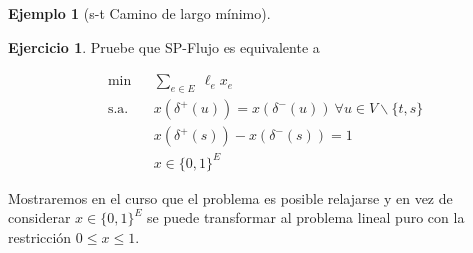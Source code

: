 \documentclass[10pt]{article}
\theoremstyle{plain}
\theoremstyle{definition}
\newtheorem{eje}{Ejemplo}
\newtheorem{ejer}{Ejercicio}
\begin{document}
\begin{eje}[s-t Camino de largo mínimo]
\begin{enumerate}[\bf I.-]
\begin{ejer}Pruebe que SP-Flujo es equivalente a

\begin{equation*}
\begin{aligned}
& \min
& & \displaystyle{\sum_{e \in E}}~\ell_{e}x_{e}\\
& \text{s.a.}
& & x(\delta^{+}(u))=x(\delta^{-}(u))~ \forall u \in V \backslash\{t,s\} \\
&&& x(\delta^{+}(s))-x(\delta^{-}(s))=1\\
&&& x \in\{0,1\}^{E}
\end{aligned}
\end{equation*}


\end{ejer}
    
\end{enumerate}

Mostraremos en el curso que el problema es posible relajarse y en vez de considerar $x\in \{0,1\}^{E}$ se puede transformar al problema lineal puro con la restricción  $0 \leq x \leq 1$.




\end{eje}
\end{document}
